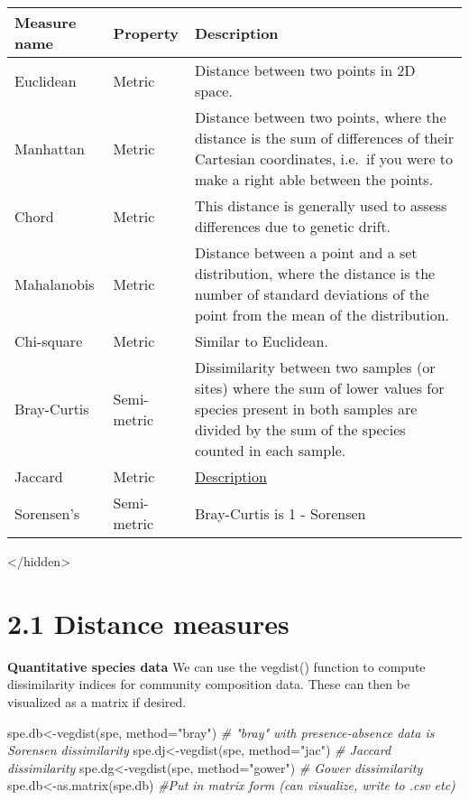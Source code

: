 \documentclass[
]{book}
\newenvironment{Shaded}{\begin{snugshade}}{\end{snugshade}}
\newcommand{\AttributeTok}[1]{\textcolor[rgb]{0.77,0.63,0.00}{#1}}
\newcommand{\CommentTok}[1]{\textcolor[rgb]{0.56,0.35,0.01}{\textit{#1}}}
\newcommand{\FunctionTok}[1]{\textcolor[rgb]{0.00,0.00,0.00}{#1}}
\newcommand{\NormalTok}[1]{#1}
\newcommand{\OtherTok}[1]{\textcolor[rgb]{0.56,0.35,0.01}{#1}}
\newcommand{\StringTok}[1]{\textcolor[rgb]{0.31,0.60,0.02}{#1}}
\begin{document}
\begin{longtable}[]{@{}lll@{}}
\toprule
Measure name & Property & Description\tabularnewline
\midrule
\endhead
Euclidean & Metric & Distance between two points in 2D space.\tabularnewline
Manhattan & Metric & Distance between two points, where the distance is the sum of differences of their Cartesian coordinates, i.e.~if you were to make a right able between the points.\tabularnewline
Chord & Metric & This distance is generally used to assess differences due to genetic drift.\tabularnewline
Mahalanobis & Metric & Distance between a point and a set distribution, where the distance is the number of standard deviations of the point from the mean of the distribution.\tabularnewline
Chi-square & Metric & Similar to Euclidean.\tabularnewline
Bray-Curtis & Semi-metric & Dissimilarity between two samples (or sites) where the sum of lower values for species present in both samples are divided by the sum of the species counted in each sample.\tabularnewline
Jaccard & Metric & \href{http://en.wikipedia.org/wiki/Jaccard_index}{Description}\tabularnewline
Sorensen's & Semi-metric & Bray-Curtis is 1 - Sorensen\tabularnewline
\bottomrule
\end{longtable}

\textless/hidden\textgreater{}

\hypertarget{distance-measures}{%
\section{2.1 Distance measures}\label{distance-measures}}

\textbf{Quantitative species data} We can use the vegdist() function to
compute dissimilarity indices for community composition data. These can
then be visualized as a matrix if desired.

\begin{Shaded}
\begin{Highlighting}[]
\NormalTok{spe.db}\OtherTok{\textless{}{-}}\FunctionTok{vegdist}\NormalTok{(spe, }\AttributeTok{method=}\StringTok{"bray"}\NormalTok{) }\CommentTok{\# "bray" with presence{-}absence data is Sorensen dissimilarity }
\NormalTok{spe.dj}\OtherTok{\textless{}{-}}\FunctionTok{vegdist}\NormalTok{(spe, }\AttributeTok{method=}\StringTok{"jac"}\NormalTok{) }\CommentTok{\# Jaccard dissimilarity}
\NormalTok{spe.dg}\OtherTok{\textless{}{-}}\FunctionTok{vegdist}\NormalTok{(spe, }\AttributeTok{method=}\StringTok{"gower"}\NormalTok{) }\CommentTok{\# Gower dissimilarity }
\NormalTok{spe.db}\OtherTok{\textless{}{-}}\FunctionTok{as.matrix}\NormalTok{(spe.db) }\CommentTok{\#Put in matrix form (can visualize, write to .csv etc)}
\end{Highlighting}
\end{Shaded}
\end{document}
